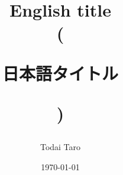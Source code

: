 \title{
English title\\
(\begin{CJK}{UTF8}{ipxm}
日本語タイトル
\end{CJK})
}
\date{\today}
\author{
Todai Taro
} 
\seifuku{} 
